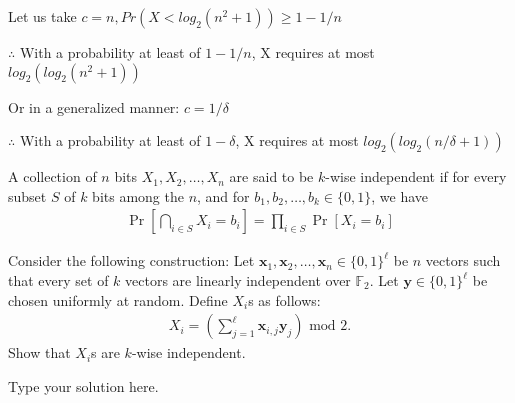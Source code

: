 \documentclass[addpoints,12pt]{exam}
\newcommand{\vect}[1]{\mathbf{#1}}
\newcommand{\F}{\mathbb{F}}
\begin{document}
\begin{questions}
\begin{parts}
\begin{solution}
               Let us take $c = n, Pr(X < log_2(n^2+1)) \geq 1 - 1/n$

               $\therefore$  With a probability at least of $1-1/n$, X requires at most $log_2(log_2(n^2+1))$

               Or in a generalized manner: $c = 1/{\delta}$

               $\therefore$  With a probability at least of $1-\delta$, X requires at most $log_2(log_2(n/{\delta}+1))$

               
             \end{solution}
           \end{parts}

           \question[5] A collection of $n$ bits $X_1, X_2, \ldots, X_n$ are
           said to be $k$-wise independent if for every subset $S$ of $k$ bits
           among the $n$, and for $b_1, b_2, \ldots, b_k \in \{0,1\}$, we have
           \begin{align*}
             \Pr\left[\bigcap_{i\in S} X_i = b_i\right] = \prod_{i\in S} \Pr\left[X_i = b_i \right]
           \end{align*}

           Consider the following construction: Let
           $\vect{x}_1, \vect{x}_2, \ldots, \vect{x}_n \in \{0,1\}^\ell$ be $n$
           vectors such that every set of $k$ vectors are linearly independent
           over $\F_2$. Let $\vect{y}\in \{0,1\}^\ell$ be chosen uniformly at
           random. Define $X_i$s as follows:
           \begin{align*}
             X_i = \left( \sum_{j=1}^\ell \vect{x}_{i,j}\vect{y}_j \right) \text{ mod $2$}.
           \end{align*}
           Show that $X_i$s are $k$-wise independent.
           \begin{solution}
               Type your solution here.
             \end{solution}
	\end{questions}
\end{document}
